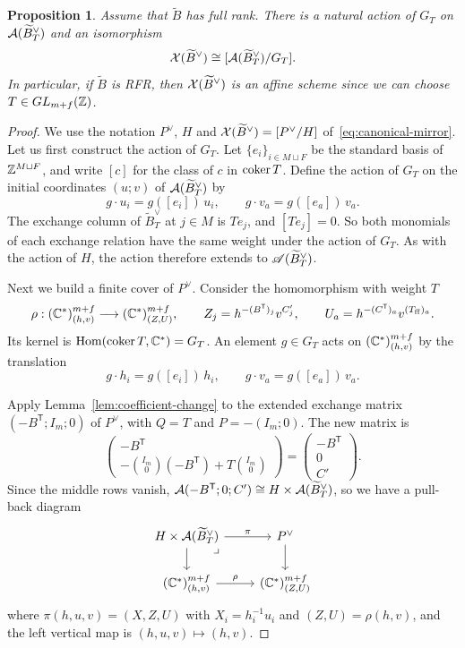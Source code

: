 \documentclass[12pt, letter]{amsart}
\newtheorem{proposition}[dummy]{Proposition}
\theoremstyle{definition}
\begin{document}
\begin{proposition}\label{prop:finite-atlas}
Assume that $\widetilde B$ has full rank.
There is a natural action of $G_T$ on $\mathcal{A}(\widetilde B_T^\vee)$ and an isomorphism
\[
    \mathcal{X}(\widetilde B^\vee)\cong[\mathcal{A}(\widetilde B_T^\vee)/G_T].
\]
In particular, if $\widetilde B$ is RFR, then \(\mathcal{X}(\widetilde B^\vee)\) is an affine scheme since we can choose  
$T\in GL_{m+f}(\mathbb{Z})$.
\end{proposition}
\begin{proof}
We use the notation $P^\vee$, $H$ and $\mathcal{X}(\widetilde B^\vee)=[P^\vee/H]$ of~\eqref{eq:canonical-mirror}.
Let us first construct the action of $G_T$.
Let $\{e_i\}_{i\in M\sqcup F}$ be the standard basis of $\mathbb{Z}^{M\sqcup F}$, and write $[c]$ for the class of $c$ in $\operatorname{coker} T$.
Define the action of $G_T$ on the initial coordinates $(u;v)$ of $\mathcal{A}(\widetilde B_T^\vee)$ by
\[
g \cdot u_i = g([e_i])\, u_i, \qquad
g \cdot v_a = g([e_a])\, v_a.
\]
The exchange column of $\widetilde B_T^\vee$ at $j\in M$ is $Te_j$, and $[Te_j]=0$.
So both monomials of each exchange relation have the same weight under the action of $G_T$.
As with the action of $H$, the action therefore extends to $\mathscr{A}(\widetilde B_T^\vee)$.

Next we build a finite cover of $P^\vee$.
Consider the homomorphism with weight $T$
\[
 \rho:(\mathbb{C}^*)^{m+f}_{(h,v)}\longrightarrow (\mathbb{C}^*)^{m+f}_{(Z,U)},\qquad
 Z_j=h^{-(B^{\mathsf T})_j}v^{C'_j},\qquad U_a=h^{-(C^{\mathsf T})_a}v^{(T_{\rm ff})_a}.
\]
Its kernel is $\operatorname{Hom}(\operatorname{coker} T,\mathbb{C}^*)=G_T$.
An element $g\in G_T$ acts on $(\mathbb{C}^*)^{m+f}_{(h,v)}$ by the translation
\[
 g\cdot h_i=g([e_i])\,h_i,\qquad g\cdot v_a=g([e_a])\,v_a .
\]

Apply Lemma~\ref{lem:coefficient-change} to the extended exchange matrix
$(-B^{\mathsf T};I_m;0)$ of $P^\vee$,
with $Q=T$ and $P=-(I_m;0)$.
The new matrix is
\[
 \begin{pmatrix}-B^{\mathsf T}\\ -\binom{I_m}{0}(-B^{\mathsf T})+T\binom{I_m}{0}\end{pmatrix}
 =\begin{pmatrix}-B^{\mathsf T}\\0\\C'\end{pmatrix}.
\]
Since the middle rows vanish,
\(\mathcal{A}(-B^{\mathsf T};0;C') \cong H\times \mathcal{A}(\widetilde B_T^\vee) \),
so we have a pull-back diagram
\[
\begin{tikzcd}
H\times \cA(\widetilde B_T^\vee)\arrow[r,"\pi"]\arrow[d]
\arrow[dr, phantom, "\lrcorner", very near start]
& P^\vee\arrow[d]\\
(\bC^*)^{m+f}_{(h,v)}\arrow[r,"\rho"] & (\bC^*)^{m+f}_{(Z,U)}
\end{tikzcd}
\]
where $\pi(h,u,v)=(X,Z,U)$ with $X_i=h_i^{-1}u_i$ and $(Z,U)=\rho(h,v)$, and the left vertical map is $(h,u,v)\mapsto(h,v)$.


\end{proof}
\end{document}

